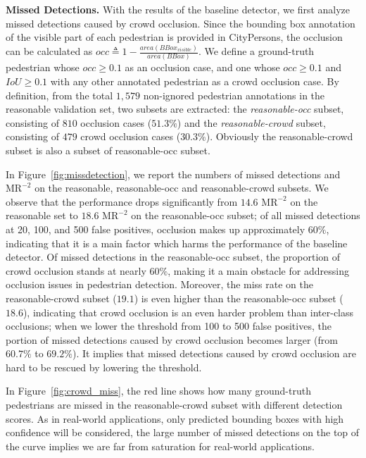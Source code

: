 \documentclass[10pt,twocolumn,letterpaper]{article}
\newcommand{\myparagraph}[1]{{\vspace{0.5em} \noindent \bf #1}}
\begin{document}
\myparagraph{Missed Detections.}
With the results of the baseline detector, we first analyze missed detections caused by crowd occlusion. Since the bounding box annotation of the visible part of each pedestrian is provided in CityPersons, the occlusion can be calculated as $occ \triangleq 1 - \frac{area(BBox_{visible})}{area(BBox)}$. We define a ground-truth pedestrian whose $occ \geq 0.1$ as an occlusion case, and one whose $occ \geq 0.1$ and $IoU \geq 0.1$ with any other annotated pedestrian as a crowd occlusion case. By definition, from the total $1,579$ non-ignored pedestrian annotations in the reasonable validation set, two subsets are extracted: the {\it reasonable-occ} subset, consisting of $810$ occlusion cases ($51.3\%$) and the {\it reasonable-crowd} subset, consisting of $479$ crowd occlusion cases ($30.3\%$). Obviously the reasonable-crowd subset is also a subset of reasonable-occ subset.

In Figure~\ref{fig:missdetection}, we report the numbers of missed detections and $\mathrm{MR}^{-2}$ on the reasonable, reasonable-occ and reasonable-crowd subsets. We observe that the performance drops significantly from $14.6$ $\mathrm{MR}^{-2}$ on the reasonable set to $18.6$ $\mathrm{MR}^{-2}$ on the reasonable-occ subset; of all missed detections at 20, 100, and 500 false positives, occlusion makes up approximately $60\%$, indicating that it is a main factor which harms the performance of the baseline detector. Of missed detections in the reasonable-occ subset, the proportion of crowd occlusion stands at nearly $60\%$, making it a main obstacle for addressing occlusion issues in pedestrian detection. Moreover, the miss rate on the reasonable-crowd subset ($19.1$) is even higher than the reasonable-occ subset ($18.6$), indicating that crowd occlusion is an even harder problem than inter-class occlusions; when we lower the threshold from 100 to 500 false positives, the portion of missed detections caused by crowd occlusion becomes larger (from $60.7\%$ to $69.2\%$). It implies that missed detections caused by crowd occlusion are hard to be rescued by lowering the threshold.

In Figure~\ref{fig:crowd_miss}, the red line shows how many ground-truth pedestrians are missed in the reasonable-crowd subset with different detection scores. As in real-world applications, only predicted bounding boxes with high confidence will be considered, the large number of missed detections on the top of the curve implies we are far from saturation for real-world applications.
\end{document}
